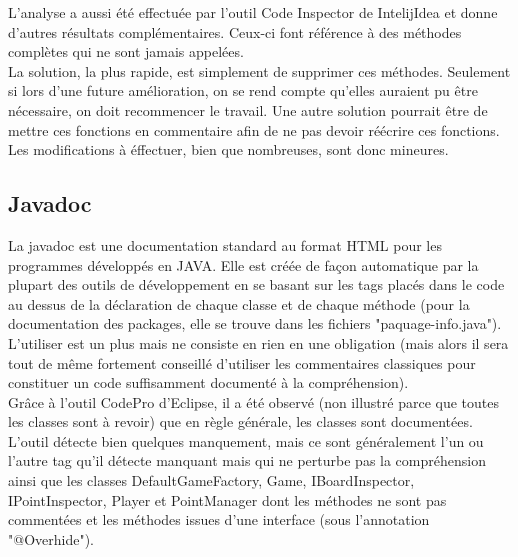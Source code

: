 \documentclass[12pt,a4paper,final]{article}
\begin{document}
L'analyse a aussi été effectuée par l'outil Code Inspector de IntelijIdea et donne d'autres résultats complémentaires. Ceux-ci font référence à des méthodes complètes qui ne sont jamais appelées.\\
La solution, la plus rapide, est simplement de supprimer ces méthodes. Seulement si lors d'une future amélioration, on se rend compte qu'elles auraient pu être nécessaire, on doit recommencer le travail. Une autre solution pourrait être de mettre ces fonctions en commentaire afin de ne pas devoir réécrire ces fonctions.\\
Les modifications à éffectuer, bien que nombreuses, sont donc mineures.

\subsection{Javadoc}\label{javadoc}
La javadoc est une documentation standard au format HTML pour les programmes développés en JAVA. Elle est créée de façon automatique par la plupart des outils de développement en se basant sur les tags placés dans le code au dessus de la déclaration de chaque classe et de chaque méthode (pour la documentation des packages, elle se trouve dans les fichiers "paquage-info.java").
L'utiliser est un plus mais ne consiste en rien en une obligation (mais alors il sera tout de même fortement conseillé d'utiliser les commentaires classiques pour constituer un code suffisamment documenté à la compréhension).\\
Grâce à l'outil CodePro d'Eclipse, il a été observé (non illustré parce que toutes les classes sont à revoir) que en règle générale, les classes sont documentées. L'outil détecte bien quelques manquement, mais ce sont généralement l'un ou l'autre tag qu'il détecte manquant mais qui ne perturbe pas la compréhension ainsi que les classes DefaultGameFactory, Game, IBoardInspector, IPointInspector, Player et PointManager dont les méthodes ne sont pas commentées et les méthodes issues d'une interface (sous l'annotation "@Overhide").

\end{document}
